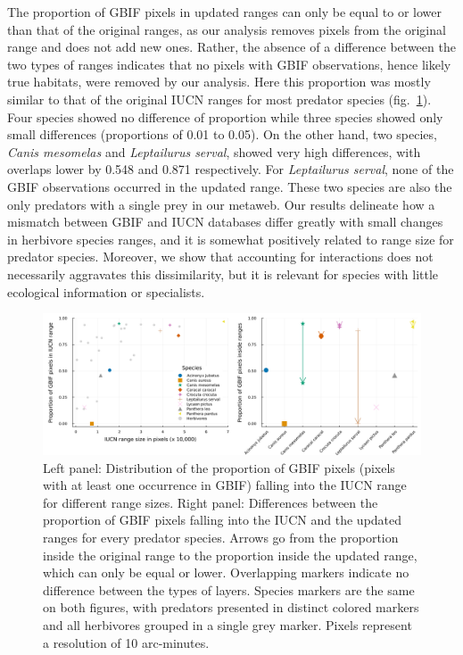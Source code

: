 \documentclass[11pt]{article}
\makeatletter
\def\maxwidth{\ifdim\Gin@nat@width>\linewidth\linewidth
\else\Gin@nat@width\fi}
\let\Oldincludegraphics\includegraphics
\renewcommand{\includegraphics}[1]{\Oldincludegraphics[width=\maxwidth]{#1}}
\makeatother
\begin{document}
The proportion of GBIF pixels in updated ranges can only be equal to or
lower than that of the original ranges, as our analysis removes pixels
from the original range and does not add new ones. Rather, the absence
of a difference between the two types of ranges indicates that no pixels
with GBIF observations, hence likely true habitats, were removed by our
analysis. Here this proportion was mostly similar to that of the
original IUCN ranges for most predator species (fig.~\ref{fig:gbif}).
Four species showed no difference of proportion while three species
showed only small differences (proportions of 0.01 to 0.05). On the
other hand, two species, \emph{Canis mesomelas} and \emph{Leptailurus
serval}, showed very high differences, with overlaps lower by 0.548 and
0.871 respectively. For \emph{Leptailurus serval}, none of the GBIF
observations occurred in the updated range. These two species are also
the only predators with a single prey in our metaweb. Our results
delineate how a mismatch between GBIF and IUCN databases differ greatly
with small changes in herbivore species ranges, and it is somewhat
positively related to range size for predator species. Moreover, we show
that accounting for interactions does not necessarily aggravates this
dissimilarity, but it is relevant for species with little ecological
information or specialists.

\begin{figure}
\hypertarget{fig:gbif}{%
\centering
\includegraphics{figures/gbif_panels.png}
\caption{Left panel: Distribution of the proportion of GBIF pixels
(pixels with at least one occurrence in GBIF) falling into the IUCN
range for different range sizes. Right panel: Differences between the
proportion of GBIF pixels falling into the IUCN and the updated ranges
for every predator species. Arrows go from the proportion inside the
original range to the proportion inside the updated range, which can
only be equal or lower. Overlapping markers indicate no difference
between the types of layers. Species markers are the same on both
figures, with predators presented in distinct colored markers and all
herbivores grouped in a single grey marker. Pixels represent a
resolution of 10 arc-minutes.}\label{fig:gbif}
}
\end{figure}
\end{document}
